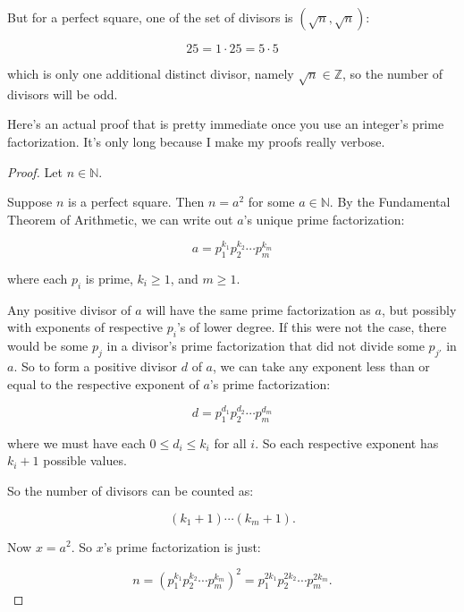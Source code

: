 \documentclass{article}
\theoremstyle{definition}
\begin{document}
But for a perfect square, one of the set of divisors is $(\sqrt{n}, \sqrt{n})$:

\begin{equation*}
25 = 1 \cdot 25 = 5 \cdot 5
\end{equation*}

which is only one additional distinct divisor, namely $\sqrt{n} \in \mathbb{Z}$, so the number of divisors will be odd.

Here's an actual proof that is pretty immediate once you use an integer's prime factorization. It's only long because I make my proofs really verbose.

\begin{proof}
Let $n \in \mathbb{N}$. 

Suppose $n$ is a perfect square. Then $n = a^2$ for some $a \in \mathbb{N}$. By the Fundamental Theorem of Arithmetic, we can write out $a$'s unique prime factorization:

\begin{equation*}
a = p_1^{k_1} p_2^{k_2} \cdots p_m^{k_m}
\end{equation*}

where each $p_i$ is prime, $k_i \geq 1$, and $m \geq 1$.

Any positive divisor of $a$ will have the same prime factorization as $a$, but possibly with exponents of respective $p_i$'s of lower degree. If this were not the case, there would be some $p_j$ in a divisor's prime factorization that did not divide some $p_{j'}$ in $a$. So to form a positive divisor $d$ of $a$, we can take any exponent less than or equal to the respective exponent of $a$'s prime factorization:

\begin{equation*}
d = p_1^{d_1} p_2^{d_2} \cdots p_m^{d_m}
\end{equation*}

where we must have each $0 \leq d_i \leq k_i$ for all $i$. So each respective exponent has $k_i + 1$ possible values.

So the number of divisors can be counted as:

\begin{equation*}
(k_1 + 1) \cdots (k_m + 1).
\end{equation*}

Now $x = a^2$. So $x$'s prime factorization is just:

\begin{equation*}
n = \left(p_1^{k_1} p_2^{k_2} \cdots p_m^{k_m}\right)^2 = p_1^{2k_1} p_2^{2k_2} \cdots p_m^{2k_m}.
\end{equation*}


\end{proof}
\end{document}
